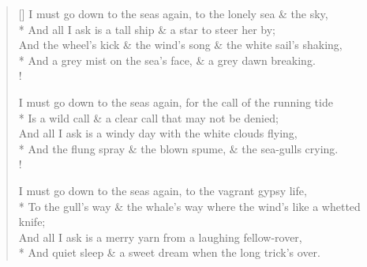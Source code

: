 \documentclass[MAIN]{subfiles}
\begin{document}
\settowidth{\versewidth}{And the wheel's kick \& the wind's song \& the white sail's shaking,}
\begin{verse}[\versewidth]
I must go down to the seas again, to the lonely sea \& the sky,\\*
And all I ask is a tall ship \& a star to steer her by;\\
And the wheel's kick \& the wind's song \& the white sail's shaking,\\*
And a grey mist on the sea's face, \& a grey dawn breaking.\\!

I must go down to the seas again, for the call of the running tide\\*
Is a wild call \& a clear call that may not be denied;\\
And all I ask is a windy day with the white clouds flying,\\*
And the flung spray \& the blown spume, \& the sea-gulls crying.\\!

I must go down to the seas again, to the vagrant gypsy life,\\*
To the gull's way \& the whale's way where the wind's like a whetted knife;\\
And all I ask is a merry yarn from a laughing fellow-rover,\\*
And quiet sleep \& a sweet dream when the long trick's over.
\end{verse}
\end{document}
